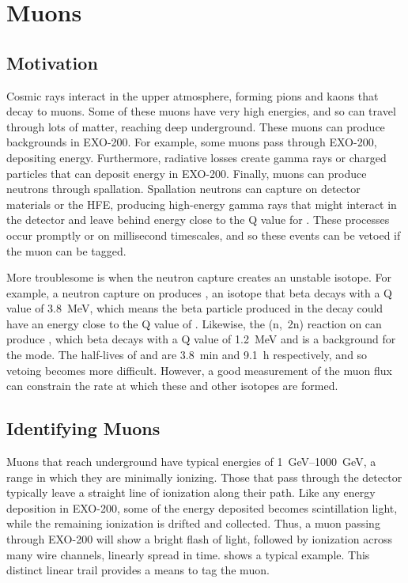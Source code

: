 \documentclass[herrin-thesis.tex]{subfiles}
\begin{document}
\chapter{Muons}
\label{ch:muons}

\section{Motivation}
\label{sec:muon_motivation}
Cosmic rays interact in the upper atmosphere, forming pions and kaons that decay to muons. Some of these muons have very high energies, and so can travel through lots of matter, reaching deep underground. These muons can produce backgrounds in EXO-200. For example, some muons pass through EXO-200, depositing energy. Furthermore, radiative losses create gamma rays or charged particles that can deposit energy in EXO-200. Finally, muons can produce neutrons through spallation. Spallation neutrons can capture on detector materials or the HFE, producing high-energy gamma rays that might interact in the detector and leave behind energy close to the Q value for . These processes occur promptly or on millisecond timescales, and so these events can be vetoed if the muon can be tagged.

More troublesome is when the neutron capture creates an unstable isotope. For example, a neutron capture on  produces , an isotope that beta decays with a Q value of \SI{3.8}{\MeV}, which means the beta particle produced in the decay could have an energy close to the Q value of . Likewise, the (n,~2n) reaction on  can produce , which beta decays with a Q value of \SI{1.2}{\MeV} and is a background for the \twonu{} mode. The half-lives of  and  are \SI{3.8}{\minute} and \SI{9.1}{\hour} respectively, and so vetoing becomes more difficult. However, a good measurement of the muon flux can constrain the rate at which these and other isotopes are formed.

\section{Identifying Muons}
\label{sec:muon_id}
Muons that reach underground have typical energies of \SIrange{1}{1000}{\GeV}, a range in which they are minimally ionizing. Those that pass through the detector typically leave a straight line of ionization along their path. Like any energy deposition in EXO-200, some of the energy deposited becomes scintillation light, while the remaining ionization is drifted and collected. Thus, a muon passing through EXO-200 will show a bright flash of light, followed by ionization across many wire channels, linearly spread in time.  shows a typical example. This distinct linear trail provides a means to tag the muon.
\end{document}
